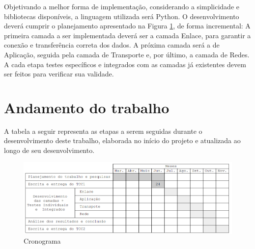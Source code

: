 Objetivando a melhor forma de implementação, considerando a simplicidade e bibliotecas disponíveis, a linguagem utilizada será Python. O desenvolvimento deverá cumprir o planejamento apresentado na Figura \ref{tab:cronograma}, de forma incremental: A primeira camada a ser implementada deverá ser a camada Enlace, para garantir a conexão e transferência correta dos dados. A próxima camada será a de Aplicação, seguida pela camada de Transporte e, por último, a camada de Redes. A cada etapa testes específicos e integrados com as camadas já existentes devem ser feitos para verificar sua validade.


\section{Andamento do trabalho}
A tabela a seguir representa as etapas a serem seguidas durante o desenvolvimento deste trabalho, elaborada no início do projeto e atualizada ao longo de seu desenvolvimento.

\begin{figure}[H]
    \includegraphics[width=\textwidth]{04-figuras/cronograma.png}
    \caption{Cronograma}
    \label{tab:cronograma}
\end{figure}
